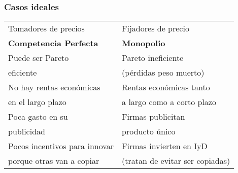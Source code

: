 \documentclass{beamer}
\begin{document}
\begin{frame}
\frametitle{Casos ideales}
\small
\begin{center}
\renewcommand{\arraystretch}{1.3} %
    \setlength{\tabcolsep}{6pt} %
    \begin{tabular}{P|P}
    \hline
    Tomadores de precios & Fijadores de precio \\
    \textbf{Competencia Perfecta} & \textbf{Monopolio}
    \\
    \hline
    Puede ser Pareto  & Pareto ineficiente \\ 
    eficiente & (pérdidas peso muerto) \\
    \hline
    No hay rentas económicas & Rentas económicas tanto \\
    en el largo plazo & a largo como a corto plazo \\
    \hline
    Poca gasto en su & Firmas publicitan \\ publicidad & producto único 
    \\
    \hline
    Pocos incentivos para innovar & Firmas invierten en IyD \\ 
    porque otras van a copiar & (tratan de evitar ser copiadas)
\end{tabular}
\end{center}
\end{frame}
\end{document}
